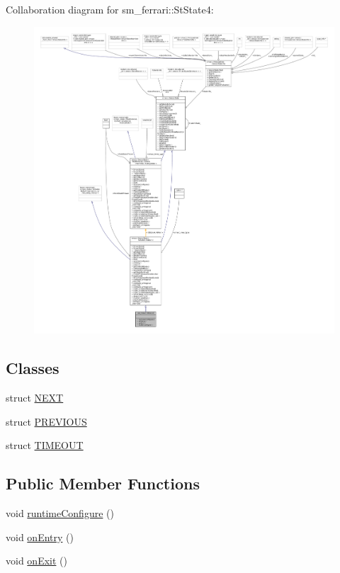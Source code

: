 Collaboration diagram for sm\+\_\+ferrari\+:\+:St\+State4\+:
\nopagebreak
\begin{figure}[H]
\begin{center}
\leavevmode
\includegraphics[width=350pt]{structsm__ferrari_1_1StState4__coll__graph}
\end{center}
\end{figure}
\subsection*{Classes}
\begin{DoxyCompactItemize}
\item 
struct \hyperlink{structsm__ferrari_1_1StState4_1_1NEXT}{N\+E\+XT}
\item 
struct \hyperlink{structsm__ferrari_1_1StState4_1_1PREVIOUS}{P\+R\+E\+V\+I\+O\+US}
\item 
struct \hyperlink{structsm__ferrari_1_1StState4_1_1TIMEOUT}{T\+I\+M\+E\+O\+UT}
\end{DoxyCompactItemize}
\subsection*{Public Member Functions}
\begin{DoxyCompactItemize}
\item 
void \hyperlink{structsm__ferrari_1_1StState4_a807a990b1e231105ccff8a3322d9bccc}{runtime\+Configure} ()
\item 
void \hyperlink{structsm__ferrari_1_1StState4_a03b9f1557aada256d6c5ce4a241ca8a6}{on\+Entry} ()
\item 
void \hyperlink{structsm__ferrari_1_1StState4_a43f0a1d52ab541edbb4ab599e2492be6}{on\+Exit} ()
\end{DoxyCompactItemize}
